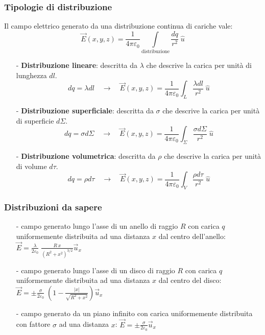 \documentclass[a4paper]{article}
\newcommand\ux{\vec{u}_x}
\begin{document}
\subsubsection*{Tipologie di distribuzione}
Il campo elettrico generato da una distribuzione continua di cariche vale:
\[\vec{E}(x,y,z) = \frac{1}{4 \pi \varepsilon_0} \int \limits_\text{distribuzione} \frac{dq}{r^2} \; \hat{u}\]
\begin{itemize}[topsep=3pt, itemsep=-7pt]
	\item[-] \textbf{Distribuzione lineare}: descritta da \(\lambda\) che descrive la carica per unità di lunghezza \(dl\).
	\[dq = \lambda dl \quad \rightarrow \quad \vec{E}(x,y,z) = \frac{1}{4 \pi \varepsilon_0} \int_L \frac{\lambda dl}{r^2} \; \hat{u}\]
	\item[-] \textbf{Distribuzione superficiale}: descritta da \(\sigma\) che descrive la carica per unità di superficie \(d\Sigma\).
	\[dq = \sigma d\Sigma \quad \rightarrow \quad \vec{E}(x,y,z) = \frac{1}{4 \pi \varepsilon_0} \int_\Sigma \frac{\sigma d\Sigma}{r^2} \; \hat{u}\]
	\item[-] \textbf{Distribuzione volumetrica}: descritta da \(\rho\) che descrive la carica per unità di volume \(d\tau\).
	\[dq = \rho d\tau \quad \rightarrow \quad \vec{E}(x,y,z) = \frac{1}{4 \pi \varepsilon_0} \int_V \frac{\rho d\tau}{r^2} \; \hat{u}\]
\end{itemize}

\subsubsection*{Distribuzioni da sapere}
\begin{itemize}[topsep=3pt, itemsep=0pt]
	\item[-] campo generato lungo l'asse di un anello di raggio \(R\) con carica \(q\) uniformemente distribuita ad una distanza
	\(x\) dal centro dell'anello: \(\displaystyle \vec{E} = \frac{\lambda}{2 \varepsilon_0} \; \frac{R \, x}{(R^2 + x^2)^{3/2}} \ux\)
	\item[-] campo generato lungo l'asse di un disco di raggio \(R\) con carica \(q\) uniformemente distribuita ad una distanza
	\(x\) dal centro del disco: \(\displaystyle \vec{E} = \pm \frac{\sigma}{2 \varepsilon_0} \; \left(1- \frac{|x|}{\sqrt{R^2 + x^2}}\right) \ux\)
	\item[-] campo generato da un piano infinito con carica uniformemente distribuita con fattore \(\sigma\) ad una distanza \(x\):
	\(\displaystyle \vec{E} = \pm \frac{\sigma}{2 \varepsilon_0}\ux\)
\end{itemize}
\end{document}
